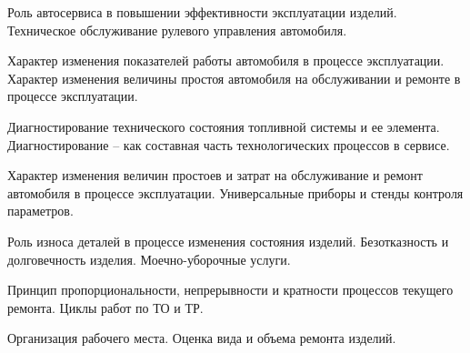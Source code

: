 \documentclass[
	14pt,
	a4paper,
	]
	{scrartcl}
\begin{document}
\shapk
{}
\setcounter{zad}{0}

\vfill
\z Роль автосервиса в повышении эффективности эксплуатации изделий.
 \vfill
\z Техническое обслуживание рулевого управления автомобиля. \vfill

\vfill

\newpage


\shapk
{}
\setcounter{zad}{0}

\vfill
\z Характер изменения показателей работы автомобиля в процессе эксплуатации.
 \vfill
\z Характер изменения величины простоя автомобиля на обслуживании и ремонте в процессе эксплуатации.
 \vfill

\vfill

\newpage


\shapk
{}
\setcounter{zad}{0}

\vfill
\z Диагностирование технического состояния топливной системы и ее элемента.
 \vfill
\z Диагностирование – как составная часть технологических процессов в сервисе.
 \vfill

\vfill

\newpage


\shapk
{}
\setcounter{zad}{0}

\vfill
\z Характер изменения величин простоев и затрат на обслуживание и ремонт автомобиля в процессе эксплуатации.
 \vfill
\z Универсальные приборы и стенды контроля параметров.
 \vfill

\vfill

\newpage


\shapk
{}
\setcounter{zad}{0}

\vfill
\z Роль износа деталей в процессе изменения состояния изделий. Безотказность и долговечность изделия.
 \vfill
\z Моечно-уборочные услуги.
 \vfill

\vfill

\newpage


\shapk
{}
\setcounter{zad}{0}

\vfill
\z Принцип пропорциональности, непрерывности и кратности процессов текущего ремонта.
 \vfill
\z Циклы работ по ТО и ТР.
 \vfill

\vfill

\newpage


\shapk
{}
\setcounter{zad}{0}

\vfill
\z Организация рабочего места.
 \vfill
\z Оценка вида и объема ремонта изделий.
 \vfill
\end{document}
